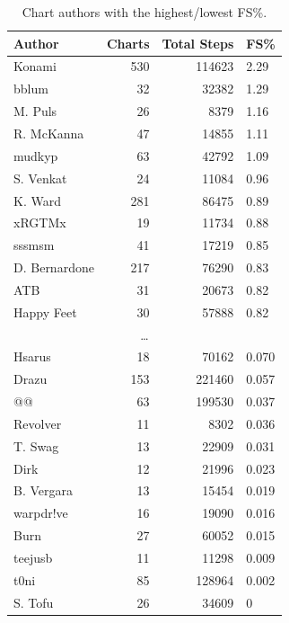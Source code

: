 \documentclass[10pt]{sigplanconf}
\begin{document}
\begin{table}[t]
	\begin{center}
		\small
	\begin{tabular}{l|r|r|l}
		\bf Author & \bf Charts & \bf Total Steps & \bf FS\% \\
		\hline
		Konami        & 530 & 114623 & 2.29 \\
		bblum         &  32 &  32382 & 1.29 \\
		M. Puls       &  26 &   8379 & 1.16 \\
		R. McKanna    &  47 &  14855 & 1.11 \\
		mudkyp        &  63 &  42792 & 1.09 \\
		S. Venkat     &  24 &  11084 & 0.96 \\
		K. Ward       & 281 &  86475 & 0.89 \\
		xRGTMx        &  19 &  11734 & 0.88 \\
		sssmsm        &  41 &  17219 & 0.85 \\
		D. Bernardone & 217 &  76290 & 0.83 \\
		ATB           &  31 &  20673 & 0.82 \\
		Happy Feet    &  30 &  57888 & 0.82 \\
		\multicolumn{4}{c}{\normalsize\dots} \\
		Hsarus        &  18 &  70162 & 0.070 \\
		Drazu         & 153 & 221460 & 0.057 \\
		@@            &  63 & 199530 & 0.037 \\
		Revolver      &  11 &   8302 & 0.036 \\
		T. Swag       &  13 &  22909 & 0.031 \\
		Dirk          &  12 &  21996 & 0.023 \\
		B. Vergara    &  13 &  15454 & 0.019 \\
		warpdr!ve     &  16 &  19090 & 0.016 \\
		Burn          &  27 &  60052 & 0.015 \\
		teejusb       &  11 &  11298 & 0.009 \\
		t0ni          &  85 & 128964 & 0.002 \\
		S. Tofu       &  26 &  34609 & 0
	\end{tabular}
	\end{center}
	\caption{Chart authors with the highest/lowest FS\%.}
\end{table}
\end{document}
